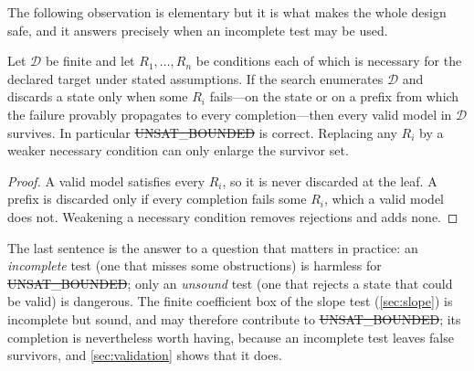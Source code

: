 The following observation is elementary but it is what makes the whole design
safe, and it answers precisely when an incomplete test may be used.

\begin{lemma}\label{lem:soundness}
Let $\mathcal D$ be finite and let $R_1,\dots,R_n$ be conditions each of which is
necessary for the declared target under stated assumptions. If the search
enumerates $\mathcal D$ and discards a state only when some $R_i$ fails---on the
state or on a prefix from which the failure provably propagates to every
completion---then every valid model in $\mathcal D$ survives. In particular
\st{UNSAT\_BOUNDED} is correct. Replacing any $R_i$ by a weaker necessary
condition can only enlarge the survivor set.
\end{lemma}

\begin{proof}
A valid model satisfies every $R_i$, so it is never discarded at the leaf. A
prefix is discarded only if every completion fails some $R_i$, which a valid
model does not. Weakening a necessary condition removes rejections and adds
none.
\end{proof}

The last sentence is the answer to a question that matters in practice: an
\emph{incomplete} test (one that misses some obstructions) is harmless for
\st{UNSAT\_BOUNDED}; only an \emph{unsound} test (one that rejects a state that
could be valid) is dangerous. The finite coefficient box of the slope test
(\cref{sec:slope}) is incomplete but sound, and may therefore contribute to
\st{UNSAT\_BOUNDED}; its completion is nevertheless worth having, because an
incomplete test leaves false survivors, and \cref{sec:validation} shows that it
does.
